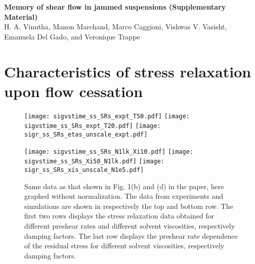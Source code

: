 \documentclass[aps,preprint,nofootinbib]{revtex4-1}
\begin{document}
\begin{center}
\textbf{Memory of shear flow in jammed suspensions (Supplementary Material)}
\\
H. A. Vinutha, Manon Marchand, Marco Caggioni, Vishwas V. Vasisht, Emanuela Del Gado, and Veronique Trappe
\date{\today}
\end{center}




\section{Characteristics of stress relaxation upon flow cessation}
\begin{figure*}[h!]
\texttt{[image: sigvstime\_ss\_SRs\_expt\_T50.pdf]}
\texttt{[image: sigvstime\_ss\_SRs\_expt\_T20.pdf]}
\texttt{[image: sigr\_ss\_SRs\_etas\_unscale\_expt.pdf]}

\texttt{[image: sigvstime\_ss\_SRs\_N1lk\_Xi10.pdf]}
\texttt{[image: sigvstime\_ss\_SRs\_Xi50\_N1lk.pdf]}
\texttt{[image: sigr\_ss\_SRs\_xis\_unscale\_N1e5.pdf]}
\caption{\label{stress_relax} Same data as that shown in Fig. 1(b) and (d) in the paper, here graphed without normalization. The data from experiments and simulations are shown in respectively the top and bottom row. The first two rows displays the stress relaxation data obtained for different preshear rates and different solvent viscosities, respectively damping factors. The last row displays the preshear rate dependence of the residual stress for different solvent viscosities, respectively damping factors.}
\end{figure*}
\end{document}
